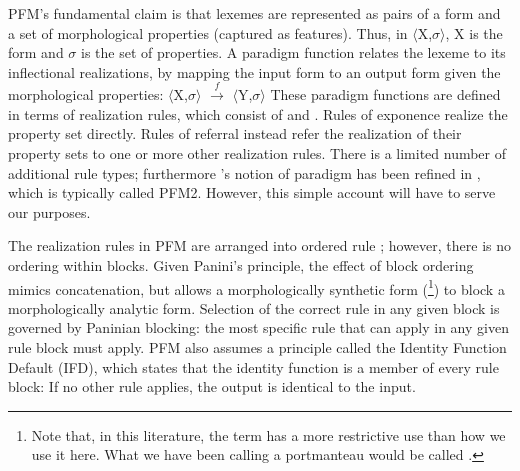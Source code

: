 \documentclass[output=paper,hidelinks]{langscibook}
\begin{document}
PFM's fundamental claim is that lexemes are represented as pairs of a form
and a set of morphological properties (captured as features). Thus, in
$\langle$X,$\sigma$$\rangle$, X is the form and $\sigma$ is the set
of properties. A paradigm function relates the lexeme to its
inflectional realizations, by mapping the input form to an output form
given the morphological properties:
\ea \label{ex:par-func}
$\langle$X,$\sigma$$\rangle$ $\overset{f}{\longrightarrow}$ $\langle$Y,$\sigma$$\rangle$
\z
%
These paradigm functions are defined in terms of realization rules,
which consist of  and . Rules of exponence realize the property set
directly. Rules of referral instead refer the realization of their
property sets to one or more other realization rules. There is a 
limited number of additional rule types; furthermore \citeauthor{Stu01}'s
\citeyearpar{Stu01} notion of paradigm has been refined in
\citet{stump16}, which is typically called PFM2. However, this simple
account will have to serve our purposes.

The realization rules in PFM are arranged into ordered rule
; however, there is no ordering within blocks. 
Given Panini's principle, the effect of block ordering mimics concatenation, but
allows a morphologically synthetic form
(\footnote{Note that, in this literature, the term
   has a more restrictive use than how we use it
  here. What we
  have been calling a portmanteau would be called . }) to block
a morphologically analytic form. Selection
of the correct rule in any given block is governed by Paninian
blocking: the most specific rule that can apply in any given rule block
must apply. PFM also assumes a principle called the Identity Function
Default (IFD), which states that the identity function is a member of every
rule block: If no other rule applies, the output is identical to the
input. 
\end{document}
